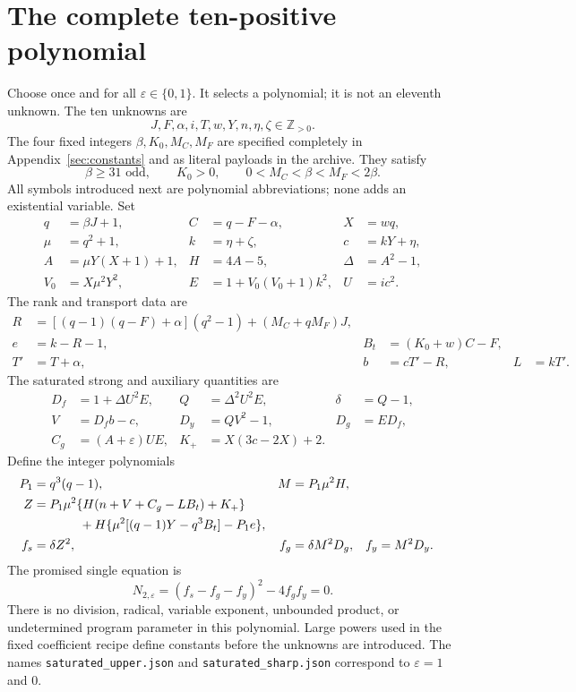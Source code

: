 \documentclass[11pt,letterpaper]{article}
\theoremstyle{remark}\newtheorem{remark}[theorem]{Remark}
\newcommand{\Z}{\mathbb Z}\newcommand{\N}{\mathbb N}
\begin{document}
\section{The complete ten-positive polynomial}
\label{sec:definition}

Choose once and for all $\varepsilon\in\{0,1\}$.  It selects a polynomial;
it is not an eleventh unknown.  The ten unknowns are
\[
 J,F,\alpha,i,T,w,Y,n,\eta,\zeta\in\Z_{>0}.
\]
The four fixed integers $\beta,K_0,M_C,M_F$ are specified completely in
Appendix~\ref{sec:constants} and as literal payloads in the archive.
They satisfy
\[
 \beta\ge31\text{ odd},\qquad K_0>0,\qquad
       0<M_C<\beta<M_F<2\beta.
\]
All symbols introduced next are polynomial abbreviations; none adds an
existential variable.  Set
\begin{align}
 q&=\beta J+1,& C&=q-F-\alpha,& X&=wq,\nonumber\\
 \mu&=q^2+1,& k&=\eta+\zeta,& c&=kY+\eta,\label{eq:outer}\\
 A&=\mu Y(X+1)+1,& H&=4A-5,&\Delta&=A^2-1,\nonumber\\
 V_0&=X\mu^2Y^2,& E&=1+V_0(V_0+1)k^2,&U&=ic^2.\label{eq:kernel}
\end{align}
The rank and transport data are
\begin{align}
 R&=[(q-1)(q-F)+\alpha](q^2-1)+(M_C+qM_F)J,\nonumber\\
 e&=k-R-1,& B_t&=(K_0+w)C-F,\nonumber\\
 T'&=T+\alpha,& b&=cT'-R,&L&=kT'.\label{eq:transport}
\end{align}
The saturated strong and auxiliary quantities are
\begin{align}
 D_f&=1+\Delta U^2E,&Q&=\Delta^2U^2E,&\delta&=Q-1,\nonumber\\
 V&=D_fb-c,&D_y&=QV^2-1,&D_g&=ED_f,\nonumber\\
 C_g&=(A+\varepsilon)UE,&K_+&=X(3c-2X)+2.\label{eq:saturated}
\end{align}
Define the integer polynomials
\begin{align}
 P_1&=q^3(q-1),&M&=P_1\mu^2H,\nonumber\\
 Z&=P_1\mu^2\{H(n+V+C_g-LB_t)+K_+\}\nonumber\\
   &\hspace{13mm}+H\{\mu^2[(q-1)Y-q^3B_t]-P_1e\},\label{eq:numerator}\\
 f_s&=\delta Z^2,& f_g&=\delta M^2D_g,&f_y&=M^2D_y.\nonumber
\end{align}
The promised single equation is
\begin{equation}
 \boxed{\quad N_{2,\varepsilon}
       =(f_s-f_g-f_y)^2-4f_gf_y=0.\quad}
 \label{eq:main}
\end{equation}
There is no division, radical, variable exponent, unbounded product, or
undetermined program parameter in this polynomial.  Large powers used in
the fixed coefficient recipe define constants before the unknowns are
introduced.  The names \texttt{saturated\_upper.json} and
\texttt{saturated\_sharp.json} correspond to $\varepsilon=1$ and $0$.
\end{document}
